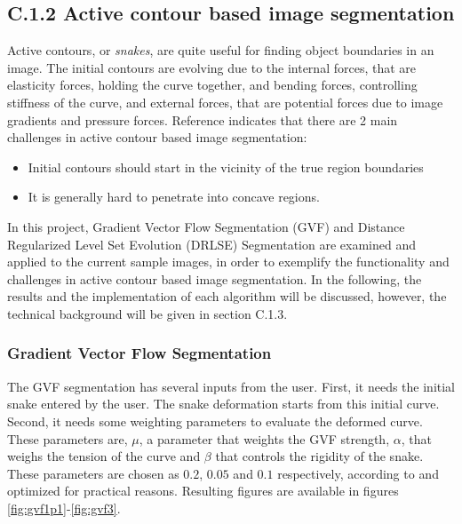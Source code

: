 \documentclass{article}
\begin{document}
\pagebreak
\subsection*{C.1.2 Active contour based image segmentation}
Active contours, or \emph{snakes}, are quite useful for finding object boundaries in an image. The initial contours are evolving due to the internal forces, that are elasticity forces, holding the curve together, and bending forces, controlling stiffness of the curve, and external forces, that are potential forces due to image gradients and pressure forces. Reference \cite{gvf} indicates that there are 2 main challenges in active contour based image segmentation:
\begin{itemize}
\item Initial contours should start in the vicinity of the true region boundaries
\item It is generally hard to penetrate into concave regions.
\end{itemize}
In this project, Gradient Vector Flow Segmentation (GVF) \cite{gvf} and Distance Regularized Level Set Evolution (DRLSE) Segmentation \cite{drlse} are examined and applied to the current sample images, in order to exemplify the functionality and challenges in active contour based image segmentation. In the following, the results and the implementation of each algorithm will be discussed, however, the technical background will be given in section C.1.3. 


\subsubsection*{Gradient Vector Flow Segmentation}
The GVF segmentation has several inputs from the user. First, it needs the initial snake entered by the user. The snake deformation starts from this initial curve. Second, it needs some weighting parameters to evaluate the deformed curve. These parameters are, $\mu$, a parameter that weights the GVF strength, $\alpha$, that weighs the tension of the curve and $\beta$ that controls the rigidity of the snake. These parameters are chosen as $0.2$, $0.05$ and $0.1$ respectively, according to \cite{gvf} and optimized for practical reasons. Resulting figures are available in figures \ref{fig:gvf1p1}-\ref{fig:gvf3}.
\end{document}
